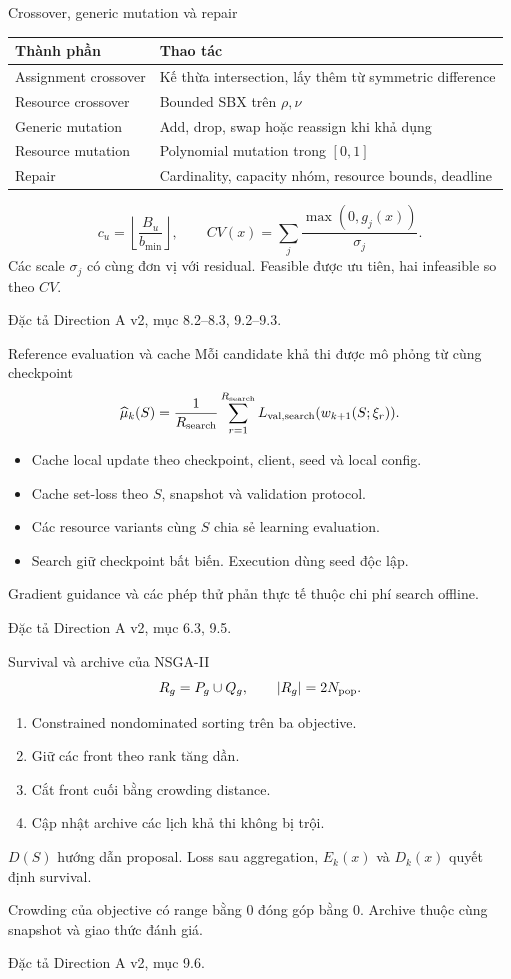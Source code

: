 \documentclass[10pt,aspectratio=43]{beamer}
\newcommand{\src}[1]{\par\vfill{\fontsize{6}{7.2}\selectfont\color{Muted}
 Đặc tả Direction A v2, mục #1.\par}}
\newcommand{\smallnote}[1]{\par{\footnotesize\color{Muted}#1\par}}
\newcommand{\val}{\mathrm{val}}
\begin{document}
\begin{frame}[t]{Crossover, generic mutation và repair}
\relax
{\small
\renewcommand{\arraystretch}{1.3}
\begin{tabularx}{.99\textwidth}{@{}lY@{}}
\toprule
\textbf{Thành phần} & \textbf{Thao tác}\\
\midrule
Assignment crossover & Kế thừa intersection, lấy thêm từ symmetric difference\\
Resource crossover & Bounded SBX trên $\rho,\nu$\\
Generic mutation & Add, drop, swap hoặc reassign khi khả dụng\\
Resource mutation & Polynomial mutation trong $[0,1]$\\
Repair & Cardinality, capacity nhóm, resource bounds, deadline\\
\bottomrule
\end{tabularx}\par
}
\medskip
\[
c_u=\left\lfloor\frac{B_u}{b_{\min}}\right\rfloor,\qquad
CV(x)=\sum_j\frac{\max(0,g_j(x))}{\sigma_j}.
\]
Các scale $\sigma_j$ có cùng đơn vị với residual. Feasible được ưu tiên, hai infeasible so theo $CV$.
\src{8.2--8.3, 9.2--9.3}
\end{frame}

\begin{frame}[t]{Reference evaluation và cache}
\relax
Mỗi candidate khả thi được mô phỏng từ cùng checkpoint
\[
\widehat\mu_k(S)=\frac1{R_{\rm search}}
\sum_{r=1}^{R_{\rm search}}
L_{\val,\rm search}(w_{k+1}(S;\xi_r)).
\]
\begin{itemize}
\setlength{\itemsep}{.5em}
\item Cache local update theo checkpoint, client, seed và local config.
\item Cache set-loss theo $S$, snapshot và validation protocol.
\item Các resource variants cùng $S$ chia sẻ learning evaluation.
\item Search giữ checkpoint bất biến. Execution dùng seed độc lập.
\end{itemize}
\smallnote{Gradient guidance và các phép thử phản thực tế thuộc chi phí search offline.}
\src{6.3, 9.5}
\end{frame}

\begin{frame}[t]{Survival và archive của NSGA-II}
\relax
\[
R_g=P_g\cup Q_g,\qquad |R_g|=2N_{\rm pop}.
\]
\begin{enumerate}
\setlength{\itemsep}{.6em}
\item Constrained nondominated sorting trên ba objective.
\item Giữ các front theo rank tăng dần.
\item Cắt front cuối bằng crowding distance.
\item Cập nhật archive các lịch khả thi không bị trội.
\end{enumerate}
\medskip
$D(S)$ hướng dẫn proposal. Loss sau aggregation, $E_k(x)$ và $D_k(x)$ quyết định survival.
\smallnote{Crowding của objective có range bằng 0 đóng góp bằng 0. Archive thuộc cùng snapshot và giao thức đánh giá.}
\src{9.6}
\end{frame}
\end{document}
